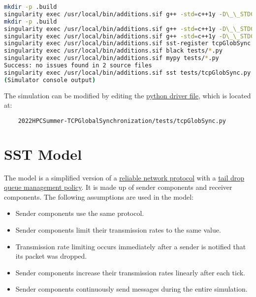 \documentclass{article}
\begin{document}
\begin{lstlisting}[language=bash, frame=none]
mkdir -p .build
singularity exec /usr/local/bin/additions.sif g++ -std=c++1y -D\_\_STDC\_FORMAT\_MACROS -fPIC -DHAVE\_CONFIG\_H -I/opt/SST/11.1.0/include -MMD -c receiver.cc -o .build/receiver.o
mkdir -p .build
singularity exec /usr/local/bin/additions.sif g++ -std=c++1y -D\_\_STDC\_FORMAT\_MACROS -fPIC -DHAVE\_CONFIG\_H -I/opt/SST/11.1.0/include -MMD -c sender.cc -o .build/sender.o
singularity exec /usr/local/bin/additions.sif g++ -std=c++1y -D\_\_STDC\_FORMAT\_MACROS -fPIC -DHAVE\_CONFIG\_H -I/opt/SST/11.1.0/include -shared -fno-common -Wl,-undefined -Wl,dynamic\_lookup -o libtcpGlobSync.so .build/receiver.o .build/sender.o
singularity exec /usr/local/bin/additions.sif sst-register tcpGlobSync tcpGlobSync\_LIBDIR=/home/{USER}/sst-work/2022HPCSummer-TCPGlobalSynchronization
singularity exec /usr/local/bin/additions.sif black tests/*.py
singularity exec /usr/local/bin/additions.sif mypy tests/*.py
Success: no issues found in 2 source files
singularity exec /usr/local/bin/additions.sif sst tests/tcpGlobSync.py
(Simulator console output)
\end{lstlisting}

\noindent The simulation can be modified by editing the \href{http://sst-simulator.org/SSTPages/SSTUserPythonFileFormat/}{python driver file}, which is located at:

\begin{verbatim}
	2022HPCSummer-TCPGlobalSynchronization/tests/tcpGlobSync.py
\end{verbatim}

\section{SST Model}

The model is a simplified version of a \href{https://en.wikipedia.org/wiki/Reliability_(computer_networking)}{reliable network protocol} with a \href{https://en.wikipedia.org/wiki/Tail_drop}{tail drop queue management policy}. It is made up of sender components and receiver components. The following assumptions are used in the model:

\begin{itemize}
	\item Sender components use the same protocol.
	\item Sender components limit their transmission rates to the same value.
	\item Transmission rate limiting occurs immediately after a sender is notified that its packet was dropped.
	\item Sender components increase their transmission rates linearly after each tick.
	\item Sender components continuously send messages during the entire simulation.
\end{itemize}
\end{document}
